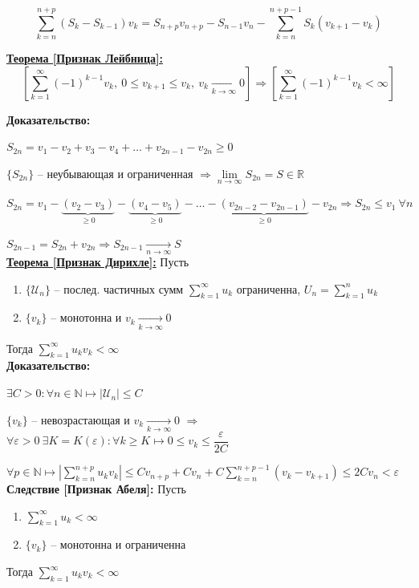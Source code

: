 \documentclass[a4paper,12pt]{article} %
\newcommand{\R}{\mathbb{R}}
\newcommand{\N}{\mathbb{N}}
\newcommand{\series}{\sum\limits_{k=1}^{\infty}}
\newcommand{\useries}{\sum\limits_{k=1}^{\infty} u_k}
\newcommand{\useriesl}{\sum\limits_{k=1}^{\infty} u_k < \infty}
\newcommand{\sn}{\sum\limits_{k=1}^{n} u_k}
\begin{document}
\[ \sum\limits_{k=n}^{n+p}(S_k - S_{k-1}) v_k = S_{n+p}v_{n+p} - S_{n-1}v_n - \sum\limits_{k=n}^{n+p-1}S_k(v_{k+1} - v_k) \]

\underline{\textbf{Теорема [Признак Лейбница]:}}
\[ \left[ \series (-1)^{k-1} v_k, \ 0 \leqslant v_{k+1} \leqslant v_k, \ v_k \xrightarrow[k \to \infty]{} 0 \right] \Rightarrow \left[ \series (-1)^{k-1} v_k < \infty \right] \]

\textbf{Доказательство:}

$S_{2n} = v_1 - v_2 + v_3 - v_4 + \ldots + v_{2n-1} - v_{2n} \geqslant 0$

$\{S_{2n}\}$ -- неубывающая и ограниченная $\Rightarrow \lim\limits_{n \to \infty} S_{2n} = S \in \R$

$S_{2n} = v_1 - \underbrace{(v_2 - v_3)}_{\geqslant 0} -  \underbrace{(v_4 - v_5)}_{\geqslant 0} - \ldots - \underbrace{(v_{2n-2} - v_{2n-1})}_{\geqslant 0} - v_{2n} \Rightarrow S_{2n} \leqslant v_1 \ \forall n$

$S_{2n-1} = S_{2n} + v_{2n} \Rightarrow S_{2n-1} \xrightarrow[n \to \infty]{} S$\\

\underline{\textbf{Теорема [Признак Дирихле]:}} Пусть
\begin{enumerate}
	\item $\{ \mathscr{U}_n \}$ -- послед. частичных сумм $\useries$ ограниченна, $U_n = \sn$
	\item $\{v_k\}$ -- монотонна и $v_k \xrightarrow[k \to \infty]{} 0$
\end{enumerate}
Тогда $\sum\limits_{k=1}^{\infty} u_k v_k < \infty$\\

\textbf{Доказательство:}

$\exists C > 0: \forall n \in \N \mapsto \left| \mathscr{U}_n \right| \leqslant C$

$\{v_k\}$ -- невозрастающая и $v_k \xrightarrow[k \to \infty]{} 0$
 $\Rightarrow$ $\forall \varepsilon > 0 \ \exists K = K(\varepsilon): \forall k \geqslant K \mapsto 0 \leqslant v_k \leqslant \dfrac{\varepsilon}{2C}$

$\forall p \in \N \mapsto \left| \sum\limits_{k=n}^{n+p} u_k v_k \right| \leqslant C v_{n+p} + C v_n + C \sum\limits_{k=n}^{n+p-1}(v_k - v_{k+1}) \leqslant 2Cv_n < \varepsilon$\\

\textbf{Следствие [Признак Абеля]:} Пусть
\begin{enumerate}
	\item $\useriesl$
	\item $\{v_k\}$ -- монотонна и ограниченна
\end{enumerate}
Тогда $\sum\limits_{k=1}^{\infty} u_k v_k < \infty$\\
\end{document}
